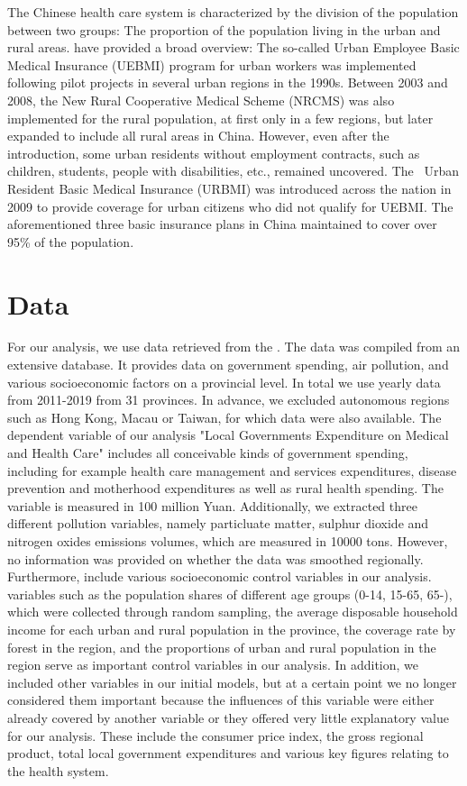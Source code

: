 \documentclass[
]{article}
\begin{document}
	The Chinese health care system is characterized by the division of the population between two groups: The proportion of the population living in the urban and rural areas.
	\cite{shi_health_2018} have provided a broad overview: The so-called Urban Employee Basic Medical Insurance (UEBMI) program for urban workers was implemented following pilot projects in several urban regions in the 1990s.
	Between 2003 and 2008, the New Rural Cooperative Medical Scheme (NRCMS) was also implemented for the rural population, at first only in a few regions, but later expanded to include all rural areas in China.
	However, even after the introduction, some urban residents without employment contracts, such as children, students, people with disabilities, etc., remained uncovered. The  Urban Resident Basic Medical Insurance (URBMI) was introduced across the nation in 2009 to provide coverage for urban citizens who did not qualify for UEBMI.
	The aforementioned three basic insurance plans in China maintained to cover over 95\% of the population.


	\section{Data} \label{Data}

	For our analysis, we use data retrieved from the \cite{NBSChina}. The data was compiled from an extensive database. It provides data on government spending, air pollution, and various socioeconomic factors on a provincial level. In total we use yearly data from 2011-2019 from 31 provinces. In advance, we excluded autonomous regions such as Hong Kong, Macau or Taiwan, for which data were also available. The dependent variable of our analysis "Local Governments Expenditure on Medical and Health Care" includes all conceivable kinds of government spending, including for example health care management and services expenditures, disease prevention and motherhood expenditures as well as rural health spending. The variable is measured in 100 million Yuan. Additionally, we extracted three different pollution variables, namely particluate matter, sulphur dioxide and nitrogen oxides emissions volumes, which are measured in 10000 tons. However, no information was provided on whether the data was smoothed regionally. Furthermore, include various socioeconomic control variables in our analysis. variables such as the population shares of different age groups (0-14, 15-65, 65-), which were collected through random sampling, the average disposable household income for each urban and rural population in the province, the coverage rate by forest in the region, and the proportions of urban and rural population in the region serve as important control variables in our analysis.
	In addition, we included other variables in our initial models, but at a certain point we no longer considered them important because the influences of this variable were either already covered by another variable or they offered very little explanatory value for our analysis. These include the consumer price index, the gross regional product, total local government expenditures and various key figures relating to the health system.
\end{document}
